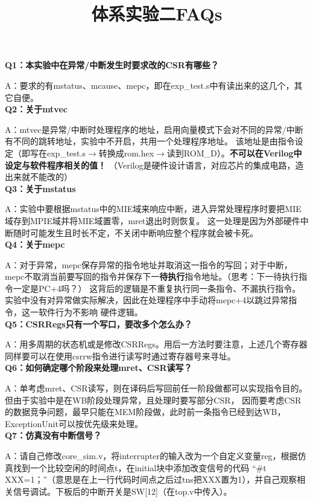 \documentclass{article}
\title{\textbf{体系实验二FAQs}\vspace{-2em}}
\author{}
\date{}
\begin{document}
\maketitle

\textbf{Q1：本实验中在异常/中断发生时要求改的CSR有哪些？}

A：要求的有mstatus、mcause、mepc，即在exp\_test.s中有读出来的这几个，其它自便。\\



\textbf{Q2：关于mtvec}

A：mtvec是异常/中断时处理程序的地址，启用向量模式下会对不同的异常/中断有不同的跳转地址，实验中不开启，共用一个处理程序地址。
该地址是由指令设定（即写在exp\_test.s$\to$转换成rom.hex$\to$读到ROM\_D）。\textbf{不可以在Verilog中设定与软件程序相关的值！}
（Verilog是硬件设计语言，对应芯片的集成电路，造出来就不能改的）\\


\textbf{Q3：关于mstatus}

A：实验中要根据mstatus中的MIE域来响应中断，进入异常处理程序时要把MIE域存到MPIE域并将MIE域置零，mret退出时则恢复。
这一处理是因为外部硬件中断随时可能发生且时长不定，不关闭中断响应整个程序就会被卡死。\\


\textbf{Q4：关于mepc}

A：对于异常，mepc保存异常的指令地址并取消这一指令的写回；对于中断，mepc不取消当前要写回的指令并保存下一\textbf{待执行}指令地址。（思考：下一待执行指令一定是PC+4吗？）
这背后的逻辑是不重复执行同一条指令、不漏执行指令。实验中没有对异常做实际解决，因此在处理程序中手动将mepc+4以跳过异常指令，这一软件行为不影响
硬件逻辑。\\


\textbf{Q5：CSRRegs只有一个写口，要改多个怎么办？}

A：用多周期的状态机或是修改CSRRegs。用后一方法时要注意，上述几个寄存器同样要可以在使用csrrw指令进行读写时通过寄存器号来寻址。\\


\textbf{Q6：如何确定哪个阶段来处理mret、CSR读写？}

A：单考虑mret、CSR读写，则在译码后写回前任一阶段做都可以实现指令目的。但由于实验中是在WB阶段处理异常，且处理时要写部分CSR，
因而要考虑CSR的数据竞争问题，最早只能在MEM阶段做，此时前一条指令已经到达WB，ExceptionUnit可以按优先级来处理。\\


\textbf{Q7：仿真没有中断信号？}

A：请自己修改core\_sim.v，将interrupter的输入改为一个自定义变量reg，根据仿真找到一个比较空闲的时间点t，在initial块中添加改变信号的代码
“\#t XXX=1；”（意思是在上一行代码时间点之后过tns把XXX置为1），并自己观察相关信号调试。下板后的中断开关是SW[12]（在top.v中传入）。
\end{document}
